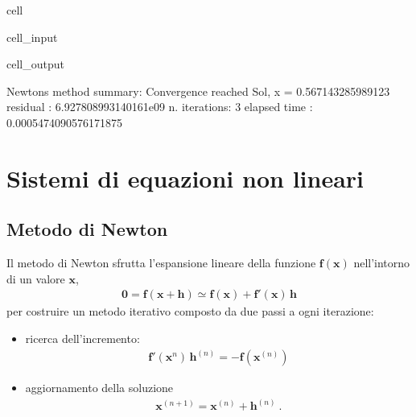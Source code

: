 \documentclass[letterpaper,10pt,italian]{jupyterBook}
\begin{document}
\begin{sphinxuseclass}{cell}
\begin{sphinxVerbatimInput}
\begin{sphinxuseclass}{cell_input}
\end{sphinxuseclass}\end{sphinxVerbatimInput}
\begin{sphinxVerbatimOutput}

\begin{sphinxuseclass}{cell_output}
\begin{sphinxVerbatim}[commandchars=\\\{\}]
Newton\PYGZsq{}s method summary: 
Convergence reached
Sol, x = \PYGZhy{}0.567143285989123
residual     : 6.927808993140161e\PYGZhy{}09
n. iterations: 3
elapsed time : 0.0005474090576171875
\end{sphinxVerbatim}

\end{sphinxuseclass}\end{sphinxVerbatimOutput}

\end{sphinxuseclass}

\section{Sistemi di equazioni non lineari}
\label{\detokenize{ch/numerics/nonlinear:sistemi-di-equazioni-non-lineari}}

\subsection{Metodo di Newton}
\label{\detokenize{ch/numerics/nonlinear:id1}}
\sphinxAtStartPar
Il metodo di Newton sfrutta l’espansione lineare della funzione \(\mathbf{f}(\mathbf{x})\) nell’intorno di un valore \(\mathbf{x}\),
\begin{equation*}
\begin{split}\mathbf{0} = \mathbf{f}(\mathbf{x} + \mathbf{h}) \simeq \mathbf{f}(\mathbf{x}) + \mathbf{f}'(\mathbf{x}) \, \mathbf{h}\end{split}
\end{equation*}
\sphinxAtStartPar
per costruire un metodo iterativo composto da due passi a ogni iterazione:
\begin{itemize}
\item {} 
\sphinxAtStartPar
ricerca dell’incremento:
\begin{equation*}
\begin{split}\mathbf{f}'(\mathbf{x}^{n}) \, \mathbf{h}^{(n)} = - \mathbf{f}(\mathbf{x}^{(n)})\end{split}
\end{equation*}
\item {} 
\sphinxAtStartPar
aggiornamento della soluzione
\begin{equation*}
\begin{split}\mathbf{x}^{(n+1)} = \mathbf{x}^{(n)} + \mathbf{h}^{(n)} \ .\end{split}
\end{equation*}
\end{itemize}
\end{document}
